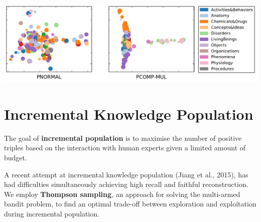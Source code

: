 \documentclass[a0,landscape]{a0poster}
\begin{document}
\begin{multicols}{3}
\begin{center}
\includegraphics[width=0.9\linewidth]{../cikm2016/images/embedding_umls.pdf}
\end{center}


\section{Incremental Knowledge Population}

The goal of \textbf{incremental population} is to maximise the number of positive triples based on the interaction with human experts given a limited amount of budget.

A recent attempt at incremental knowledge population (Jiang et al., 2015), has had difficulties simultaneously achieving high recall and faithful reconstruction. We employ \textbf{Thompson sampling}, an approach for solving the multi-armed bandit problem, to find an optimal trade-off between exploration and exploitation during incremental population.


\end{multicols}
\end{document}
